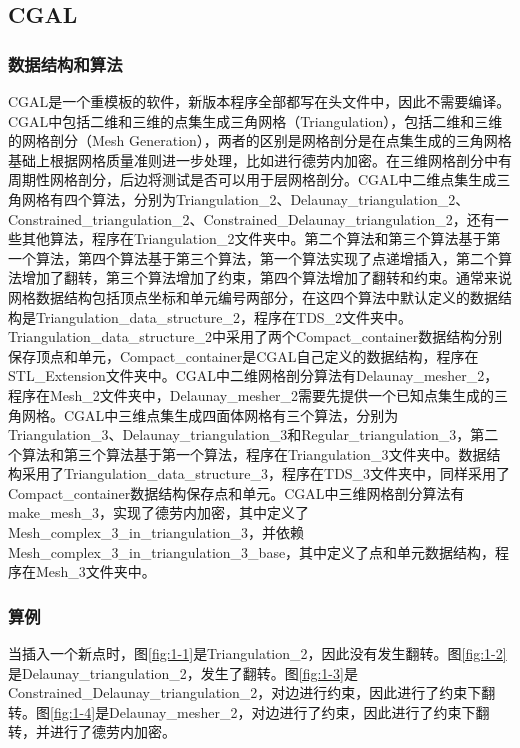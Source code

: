 \subsection{CGAL}

\subsubsection{数据结构和算法}
CGAL是一个重模板的软件，新版本程序全部都写在头文件中，因此不需要编译。CGAL中包括二维和三维的点集生成三角网格（Triangulation），包括二维和三维的网格剖分（Mesh Generation），两者的区别是网格剖分是在点集生成的三角网格基础上根据网格质量准则进一步处理，比如进行德劳内加密。在三维网格剖分中有周期性网格剖分，后边将测试是否可以用于层网格剖分。CGAL中二维点集生成三角网格有四个算法，分别为Triangulation\_2、Delaunay\_triangulation\_2、Constrained\_triangulation\_2、Constrained\_Delaunay\_triangulation\_2，还有一些其他算法，程序在Triangulation\_2文件夹中。第二个算法和第三个算法基于第一个算法，第四个算法基于第三个算法，第一个算法实现了点递增插入，第二个算法增加了翻转，第三个算法增加了约束，第四个算法增加了翻转和约束。通常来说网格数据结构包括顶点坐标和单元编号两部分，在这四个算法中默认定义的数据结构是Triangulation\_data\_structure\_2，程序在TDS\_2文件夹中。Triangulation\_data\_structure\_2中采用了两个Compact\_container数据结构分别保存顶点和单元，Compact\_container是CGAL自己定义的数据结构，程序在STL\_Extension文件夹中。CGAL中二维网格剖分算法有Delaunay\_mesher\_2，程序在Mesh\_2文件夹中，Delaunay\_mesher\_2需要先提供一个已知点集生成的三角网格。CGAL中三维点集生成四面体网格有三个算法，分别为Triangulation\_3、Delaunay\_triangulation\_3和Regular\_triangulation\_3，第二个算法和第三个算法基于第一个算法，程序在Triangulation\_3文件夹中。数据结构采用了Triangulation\_data\_structure\_3，程序在TDS\_3文件夹中，同样采用了Compact\_container数据结构保存点和单元。CGAL中三维网格剖分算法有make\_mesh\_3，实现了德劳内加密，其中定义了Mesh\_complex\_3\_in\_triangulation\_3，并依赖Mesh\_complex\_3\_in\_triangulation\_3\_base，其中定义了点和单元数据结构，程序在Mesh\_3文件夹中。

\subsubsection{算例}
当插入一个新点时，图\ref{fig:1-1}是Triangulation\_2，因此没有发生翻转。图\ref{fig:1-2}是Delaunay\_triangulation\_2，发生了翻转。图\ref{fig:1-3}是Constrained\_Delaunay\_triangulation\_2，对边进行约束，因此进行了约束下翻转。图\ref{fig:1-4}是Delaunay\_mesher\_2，对边进行了约束，因此进行了约束下翻转，并进行了德劳内加密。

